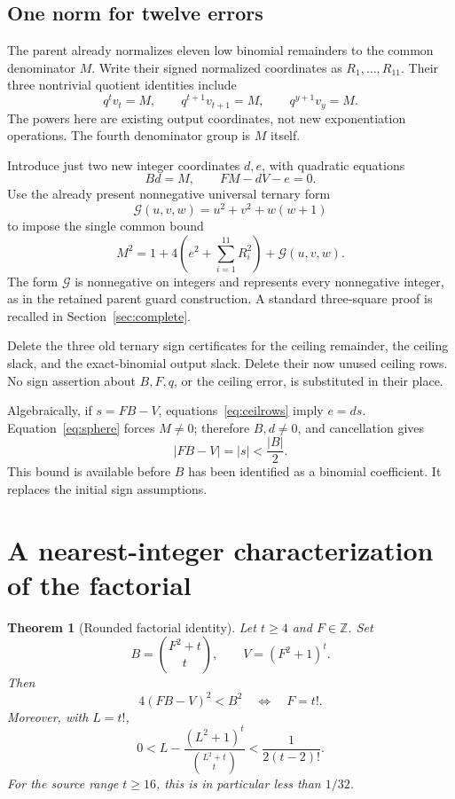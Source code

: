 \documentclass[11pt,letterpaper]{article}
\newtheorem{theorem}{Theorem}[section]
\theoremstyle{remark}\newtheorem{remark}[theorem]{Remark}
\newcommand{\Z}{\mathbb Z}\newcommand{\N}{\mathbb N}
\newcommand{\G}{\mathcal G}
\begin{document}
\subsection{One norm for twelve errors}

The parent already normalizes eleven low binomial remainders to the common
denominator \(M\). Write their signed normalized coordinates as
\(R_1,\ldots,R_{11}\). Their three nontrivial quotient identities include
\[
 q^t v_t=M,\qquad q^{t+1}v_{t+1}=M,\qquad q^{y+1}v_y=M.
\]
The powers here are existing output coordinates, not new exponentiation
operations. The fourth denominator group is \(M\) itself.

Introduce just two new integer coordinates \(d,e\), with quadratic equations
\begin{equation}\label{eq:ceilrows}
 Bd=M,\qquad FM-dV-e=0.
\end{equation}
Use the already present nonnegative universal ternary form
\[
 \G(u,v,w)=u^2+v^2+w(w+1)
\]
to impose the single common bound
\begin{equation}\label{eq:sphere}
 M^2=1+4\left(e^2+\sum_{i=1}^{11}R_i^2\right)+\G(u,v,w).
\end{equation}
The form \(\G\) is nonnegative on integers and represents every nonnegative
integer, as in the retained parent guard construction. A standard
three-square proof is recalled in Section~\ref{sec:complete}.

Delete the three old ternary sign certificates for the ceiling remainder,
the ceiling slack, and the exact-binomial output slack. Delete their now
unused ceiling rows. No sign assertion about \(B,F,q\), or the ceiling error,
is substituted in their place.

Algebraically, if \(s=FB-V\), equations~\eqref{eq:ceilrows} imply
\(e=ds\). Equation~\eqref{eq:sphere} forces \(M\ne0\); therefore
\(B,d\ne0\), and cancellation gives
\begin{equation}\label{eq:rounded-bound}
 |FB-V|=|s|<\frac{|B|}{2}.
\end{equation}
This bound is available before \(B\) has been identified as a binomial
coefficient. It replaces the initial sign assumptions.

\section{A nearest-integer characterization of the factorial}

\begin{theorem}[Rounded factorial identity]\label{thm:rounded}
Let \(t\ge4\) and \(F\in\Z\). Set
\[
 B=\binom{F^2+t}{t},\qquad V=(F^2+1)^t.
\]
Then
\[
 4(FB-V)^2<B^2\quad\Longleftrightarrow\quad F=t!.
\]
Moreover, with \(L=t!\),
\begin{equation}\label{eq:margin}
 0<L-\frac{(L^2+1)^t}{\binom{L^2+t}{t}}
 <\frac{1}{2(t-2)!}.
\end{equation}
For the source range \(t\ge16\), this is in particular less than \(1/32\).
\end{theorem}
\end{document}

